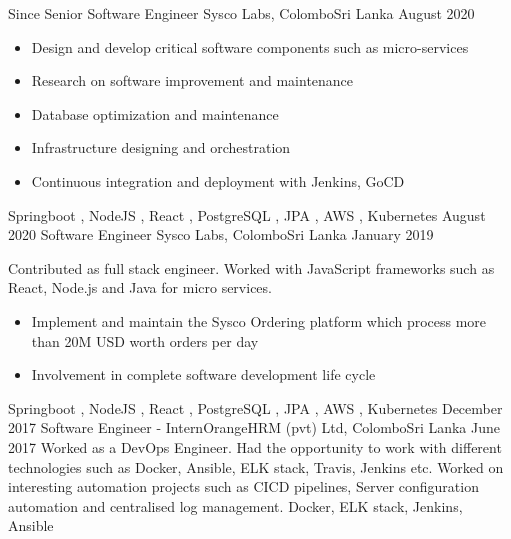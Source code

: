 

\begin{experiences}
  \experience
    {Since}   {Senior Software Engineer}{ Sysco Labs, Colombo}{Sri Lanka}
    {August 2020} {
                      \begin{itemize}
                       \item Design and develop critical software components such as micro-services
                       \item Research on software improvement and maintenance
                       \item Database optimization and maintenance
                       \item Infrastructure designing and orchestration
                        \item Continuous integration and deployment with Jenkins, GoCD 
                      \end{itemize}
                    }
                    {Springboot , NodeJS , React , PostgreSQL , JPA , AWS , Kubernetes}
  \emptySeparator
  \experience
    {August 2020} {Software Engineer}{ Sysco Labs, Colombo}{Sri Lanka}
    {January 2019} {
                   Contributed as full stack engineer. Worked with JavaScript frameworks
                    such as React, Node.js and Java for micro services.
                    \begin{itemize}
                       \item  Implement and maintain the Sysco Ordering platform which process more than
                            20M USD worth orders per day
                       \item Involvement in complete software development life cycle                      
                      \end{itemize}
                    }
                    {Springboot , NodeJS , React , PostgreSQL , JPA , AWS , Kubernetes}
  \emptySeparator
  \experience
    {December 2017}     {Software Engineer - Intern}{OrangeHRM (pvt) Ltd, Colombo}{Sri Lanka}
    {June 2017}    {
                     Worked as a DevOps Engineer. Had the opportunity to work with different technologies such as Docker, Ansible, ELK stack, Travis, Jenkins etc. Worked on interesting automation projects such as CICD pipelines, Server configuration automation and centralised log management.
                    }
                    { Docker, ELK stack, Jenkins, Ansible}

\end{experiences}
